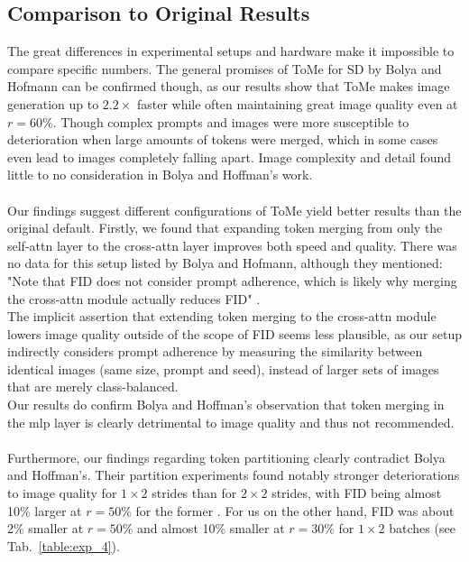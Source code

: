 \subsection{Comparison to Original Results}
The great differences in experimental setups and hardware make it impossible to compare specific numbers. The general promises of ToMe for SD by Bolya and Hofmann can be confirmed though, as our results show that ToMe makes image generation up to $2.2 \times$ faster while often maintaining great image quality even at \(r = 60\%\). Though complex prompts and images were more susceptible to deterioration when large amounts of tokens were merged, which in some cases even lead to images completely falling apart. Image complexity and detail found little to no consideration in Bolya and Hoffman's work.\\
\\
Our findings suggest different configurations of ToMe yield better results than the original default.
Firstly, we found that expanding token merging from only the self-attn layer to the cross-attn layer improves both speed and quality. There was no data for this setup listed by Bolya and Hofmann, although they mentioned: "Note that FID does not consider prompt adherence, which is likely why merging the cross-attn module actually reduces FID" \cite{bolya2023tomesd}. \\
The implicit assertion that extending token merging to the cross-attn module lowers image quality outside of the scope of FID seems less plausible, as our setup indirectly considers prompt adherence by measuring the similarity between identical images (same size, prompt and seed), instead of larger sets of images that are merely class-balanced.\\
Our results do confirm Bolya and Hoffman's observation that token merging in the mlp layer is clearly detrimental to image quality and thus not recommended.\\
\\
Furthermore, our findings regarding token partitioning clearly contradict Bolya and Hoffman's. Their partition experiments found notably stronger deteriorations to image quality for $1 \times 2$ strides than for $2 \times 2$ strides, with FID being almost 10\% larger at \(r=50\%\) for the former \cite[Tab.~2 (a)]{bolya2023tomesd}. For us on the other hand, FID was about 2\% smaller at \(r=50\%\) and almost 10\% smaller at \(r=30\%\) for $1 \times 2$ batches (see Tab.~\ref{table:exp_4}). 
